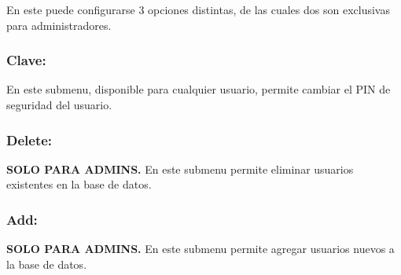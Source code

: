 {En este puede configurarse 3 opciones distintas, de las cuales dos son exclusivas para administradores.

\subsubsection*{Clave:}

En este submenu, disponible para cualquier usuario, permite cambiar el PIN de seguridad del usuario.

\subsubsection*{Delete:}

\textbf{SOLO PARA ADMINS.} En este submenu permite eliminar usuarios existentes en la base de datos.

\subsubsection*{Add:}

\textbf{SOLO PARA ADMINS.} En este submenu permite agregar usuarios nuevos a la base de datos.

}

